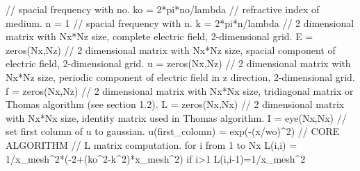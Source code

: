 \documentclass[a4paper]{article}
\begin{document}
{		\textcolor{OliveGreen}{// spacial frequency with no.}\newline
		ko = 2*pi*no/lambda\newline
		\textcolor{OliveGreen}{// refractive index of medium.}\newline
		n = 1\newline
		\textcolor{OliveGreen}{// spacial frequency with n.}\newline
		k = 2*pi*n/lambda\newline\newline
		\textcolor{OliveGreen}{// 2 dimensional matrix with Nx*Nz size, complete electric field, 2-dimensional grid.}\newline
		E = zeros(Nx,Nz)\newline
		\textcolor{OliveGreen}{// 2 dimensional matrix with Nx*Nz size, spacial component of electric field, 2-dimensional grid.}\newline
		u = zeros(Nx,Nz)\newline
		\textcolor{OliveGreen}{// 2 dimensional matrix with Nx*Nz size, periodic component of electric field in z direction, 2-dimensional grid.}\newline
		f = zeros(Nx,Nz)\newline
		\textcolor{OliveGreen}{// 2 dimensional matrix with Nx*Nx size, tridiagonal matrix or Thomas algorithm (see section 1.2).}\newline
		L = zeros(Nx,Nx)\newline
		\textcolor{OliveGreen}{// 2 dimensional matrix with Nx*Nx size, identity matrix used in Thomas algorithm.}\newline
		I = eye(Nx,Nx)\newline\newline
		\textcolor{OliveGreen}{// set first column of u to gaussian.}\newline
		u(first\_colomn) = exp(-(x/wo)\string^2)\newline\newline
		\textcolor{OliveGreen}{// CORE ALGORITHM}\newline\newline
		\textcolor{OliveGreen}{// L matrix computation.}\newline
		for i from 1 to Nx \newline
		\indent L(i,i) = 1/x\_mesh\string^2*(-2+(ko\string^2-k\string^2)*x\_mesh\string^2)\newline
		\indent if i>1\newline
		\indent\indent L(i,i-1)=1/x\_mesh\string^2\newline
}
\end{document}
